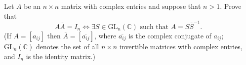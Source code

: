 \documentclass{article}
\begin{document}
\setlength{\parindent}{0pt}
Let $A$ be an $n\times n$ matrix with complex entries and suppose that $n>1$. Prove that$$A\overline{A}=I_{n}\iff\exists S\in\text{GL}_{n}(\mathbb{C})\text{ such that }A=S\overline{S}^{-1}.$$(If $A=[a_{ij}]$ then $\overline{A}=[\overline{a_{ij}}]$, where $\overline{a_{ij}}$ is the complex conjugate of $a_{ij}$; $\text{GL}_{n}(\mathbb{C})$ denotes the set of all $n\times n$ invertible matrices with complex entries, and $I_{n}$ is the identity matrix.)
\end{document}
